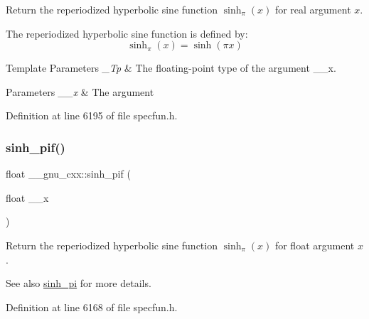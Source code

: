 Return the reperiodized hyperbolic sine function $ \sinh_\pi(x) $ for real argument $ x $.

The reperiodized hyperbolic sine function is defined by\+: \[ \sinh_\pi(x) = \sinh(\pi x) \]


\begin{DoxyTemplParams}{Template Parameters}
{\em \+\_\+\+Tp} & The floating-\/point type of the argument {\ttfamily \+\_\+\+\_\+x}. \\
\hline
\end{DoxyTemplParams}

\begin{DoxyParams}{Parameters}
{\em \+\_\+\+\_\+x} & The argument \\
\hline
\end{DoxyParams}


Definition at line 6195 of file specfun.\+h.

\mbox{\label{group__gnu__math__spec__func_ga74103f57ab0d97126732f3cb276c5ab3}} 
\subsubsection{\texorpdfstring{sinh\+\_\+pif()}{sinh\_pif()}}
{\footnotesize\ttfamily float \+\_\+\+\_\+gnu\+\_\+cxx\+::sinh\+\_\+pif (\begin{DoxyParamCaption}\item[{float}]{\+\_\+\+\_\+x }\end{DoxyParamCaption})\hspace{0.3cm}{\ttfamily [inline]}}

Return the reperiodized hyperbolic sine function $ \sinh_\pi(x) $ for {\ttfamily float} argument $ x $.

\begin{DoxySeeAlso}{See also}
\hyperlink{group__gnu__math__spec__func_gade43453b87b6b38c05b3fcce40870542}{sinh\+\_\+pi} for more details. 
\end{DoxySeeAlso}


Definition at line 6168 of file specfun.\+h.

\mbox{\label{group__gnu__math__spec__func_ga2232ee554ef2a902824db42e2e09c483}} 

